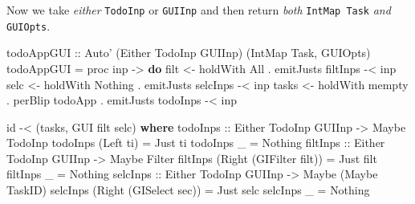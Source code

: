 \documentclass[]{article}
\newenvironment{Shaded}{}{}
\newcommand{\KeywordTok}[1]{\textcolor[rgb]{0.00,0.44,0.13}{\textbf{{#1}}}}
\newcommand{\DataTypeTok}[1]{\textcolor[rgb]{0.56,0.13,0.00}{{#1}}}
\newcommand{\OtherTok}[1]{\textcolor[rgb]{0.00,0.44,0.13}{{#1}}}
\newcommand{\FunctionTok}[1]{\textcolor[rgb]{0.02,0.16,0.49}{{#1}}}
\newcommand{\NormalTok}[1]{{#1}}
\begin{document}
Now we take \emph{either} \texttt{TodoInp} or \texttt{GUIInp} and then
return \emph{both} \texttt{IntMap\ Task} \emph{and} \texttt{GUIOpts}.

\begin{Shaded}
\begin{Highlighting}[]
\OtherTok{todoAppGUI ::} \DataTypeTok{Auto'} \NormalTok{(}\DataTypeTok{Either} \DataTypeTok{TodoInp} \DataTypeTok{GUIInp}\NormalTok{) (}\DataTypeTok{IntMap} \DataTypeTok{Task}\NormalTok{, }\DataTypeTok{GUIOpts}\NormalTok{)}
\NormalTok{todoAppGUI }\FunctionTok{=} \NormalTok{proc inp }\OtherTok{->} \KeywordTok{do}
    \NormalTok{filt  }\OtherTok{<-} \NormalTok{holdWith }\DataTypeTok{All}                      \FunctionTok{.} \NormalTok{emitJusts filtInps }\FunctionTok{-<} \NormalTok{inp}
    \NormalTok{selc  }\OtherTok{<-} \NormalTok{holdWith }\DataTypeTok{Nothing}                  \FunctionTok{.} \NormalTok{emitJusts selcInps }\FunctionTok{-<} \NormalTok{inp}
    \NormalTok{tasks }\OtherTok{<-} \NormalTok{holdWith mempty }\FunctionTok{.} \NormalTok{perBlip todoApp }\FunctionTok{.} \NormalTok{emitJusts todoInps }\FunctionTok{-<} \NormalTok{inp}

    \NormalTok{id }\FunctionTok{-<} \NormalTok{(tasks, }\DataTypeTok{GUI} \NormalTok{filt selc)}
  \KeywordTok{where}
\OtherTok{    todoInps ::} \DataTypeTok{Either} \DataTypeTok{TodoInp} \DataTypeTok{GUIInp} \OtherTok{->} \DataTypeTok{Maybe} \DataTypeTok{TodoInp}
    \NormalTok{todoInps (}\DataTypeTok{Left} \NormalTok{ti) }\FunctionTok{=} \DataTypeTok{Just} \NormalTok{ti}
    \NormalTok{todoInps _         }\FunctionTok{=} \DataTypeTok{Nothing}
\OtherTok{    filtInps ::} \DataTypeTok{Either} \DataTypeTok{TodoInp} \DataTypeTok{GUIInp} \OtherTok{->} \DataTypeTok{Maybe} \DataTypeTok{Filter}
    \NormalTok{filtInps (}\DataTypeTok{Right} \NormalTok{(}\DataTypeTok{GIFilter} \NormalTok{filt)) }\FunctionTok{=} \DataTypeTok{Just} \NormalTok{filt}
    \NormalTok{filtInps _                       }\FunctionTok{=} \DataTypeTok{Nothing}
\OtherTok{    selcInps ::} \DataTypeTok{Either} \DataTypeTok{TodoInp} \DataTypeTok{GUIInp} \OtherTok{->} \DataTypeTok{Maybe} \NormalTok{(}\DataTypeTok{Maybe} \DataTypeTok{TaskID}\NormalTok{)}
    \NormalTok{selcInps (}\DataTypeTok{Right} \NormalTok{(}\DataTypeTok{GISelect} \NormalTok{sec))  }\FunctionTok{=} \DataTypeTok{Just} \NormalTok{selc}
    \NormalTok{selcInps _                       }\FunctionTok{=} \DataTypeTok{Nothing}
\end{Highlighting}
\end{Shaded}
\end{document}
